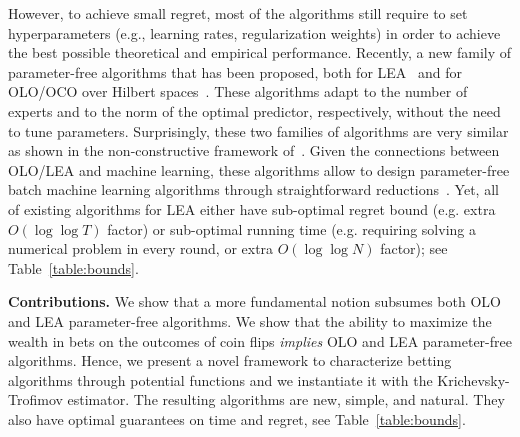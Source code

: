 However, to achieve small regret, most of the algorithms still require to set
hyperparameters (e.g., learning rates, regularization weights) in order to
achieve the best possible theoretical and empirical performance.  Recently, a
new family of parameter-free algorithms that has been proposed, both for
\ac{LEA}~\cite{Chaudhuri-Freund-Hsu-2009, Chernov-Vovk-2010, Luo-Schapire-2014,
Luo-Schapire-2015, Koolen-van-Erven-2015} and for \ac{OLO}/\ac{OCO} over
Hilbert spaces~\cite{Streeter-McMahan-2012, Orabona-2013,
McMahan-Abernethy-2013, McMahan-Orabona-2014, Orabona-2014}.  These algorithms
adapt to the number of experts and to the norm of the optimal predictor,
respectively, without the need to tune parameters.  Surprisingly, these two
families of algorithms are very similar as shown in the non-constructive
framework of~\cite{Foster-Rakhlin-Sridharan-2015}.  Given the connections
between \ac{OLO}/\ac{LEA} and machine learning, these algorithms allow to
design parameter-free batch machine learning algorithms through straightforward
reductions~\cite{Orabona-2014, Luo-Schapire-2015}.  Yet, all of existing
algorithms for LEA either have sub-optimal regret bound (e.g. extra $O(\log
\log T)$ factor) or sub-optimal running time (e.g. requiring solving a
numerical problem in every round, or extra $O(\log \log N)$ factor); see
Table~\ref{table:bounds}.

\textbf{Contributions.} We show that a more fundamental notion subsumes both
\ac{OLO} and \ac{LEA} parameter-free algorithms. We show that the ability to
maximize the wealth in bets on the outcomes of coin flips \emph{implies}
\ac{OLO} and \ac{LEA} parameter-free algorithms.  Hence, we present a novel
framework to characterize betting algorithms through potential functions and we
instantiate it with the Krichevsky-Trofimov estimator.  The resulting
algorithms are new, simple, and natural. They also have optimal guarantees on time and regret, see
Table~\ref{table:bounds}.

